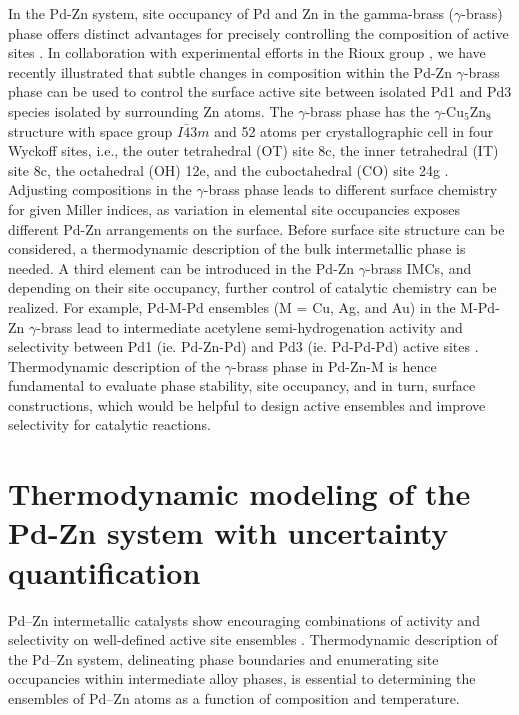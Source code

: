 In the Pd-Zn system, site occupancy of Pd and Zn in the gamma-brass ($\gamma$-brass) phase offers distinct advantages for precisely controlling the composition of active sites \cite{dasgupta2019generalized}. In collaboration with experimental efforts in the Rioux group \cite{Dasgupta2022}, we have recently illustrated that subtle changes in composition within the Pd-Zn $\gamma$-brass phase can be used to control the surface active site between isolated Pd1 and Pd3 species isolated by surrounding Zn atoms. The $\gamma$-brass phase has the $\gamma$-Cu$_5$Zn$_8$ structure with space group $I\bar{4}3m$ and 52 atoms per crystallographic cell in four Wyckoff sites, i.e., the outer tetrahedral (OT) site 8c, the inner tetrahedral (IT) site 8c, the octahedral (OH) 12e, and the cuboctahedral (CO) site 24g \cite{strom1969x}. Adjusting compositions in the $\gamma$-brass phase leads to different surface chemistry for given Miller indices, as variation in elemental site occupancies exposes different Pd-Zn arrangements on the surface. Before surface site structure can be considered, a thermodynamic description of the bulk intermetallic phase is needed. A third element can be introduced in the Pd-Zn $\gamma$-brass IMCs, and depending on their site occupancy, further control of catalytic chemistry can be realized. For example, Pd-M-Pd ensembles (M = Cu, Ag, and Au) in the M-Pd-Zn $\gamma$-brass lead to intermediate acetylene semi-hydrogenation activity and selectivity between Pd1 (ie. Pd-Zn-Pd) and Pd3 (ie. Pd-Pd-Pd) active sites \cite{Dasgupta2022}. Thermodynamic description of the $\gamma$-brass phase in Pd-Zn-M is hence fundamental to evaluate phase stability, site occupancy, and in turn, surface constructions, which would be helpful to design active ensembles and improve selectivity for catalytic reactions. 

\section{Thermodynamic modeling of the Pd-Zn system with uncertainty quantification} \label{intermetallics:sec:PdZn}
Pd–Zn intermetallic catalysts show encouraging combinations of activity and selectivity on well-defined active site ensembles \cite{Dasgupta2022}. Thermodynamic description of the Pd–Zn system, delineating phase boundaries and enumerating site occupancies within intermediate alloy phases, is essential to determining the ensembles of Pd–Zn atoms as a function of composition and temperature. 

